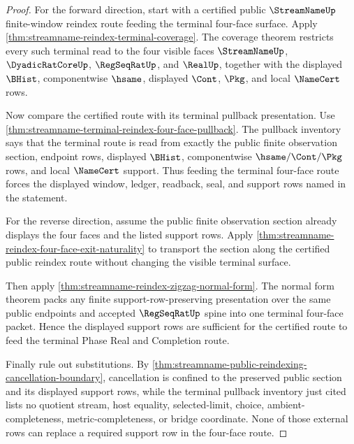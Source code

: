 \begin{proof}
For the forward direction, start with a certified public $\StreamNameUp$
finite-window reindex route feeding the terminal four-face surface. Apply
\autoref{thm:streamname-reindex-terminal-coverage}. The coverage theorem
restricts every such terminal read to the four visible faces
$\StreamNameUp$, $\DyadicRatCoreUp$, $\RegSeqRatUp$, and $\RealUp$, together
with the displayed $\BHist$, componentwise $\hsame$, displayed $\Cont$,
$\Pkg$, and local $\NameCert$ rows.

Now compare the certified route with its terminal pullback presentation. Use
\autoref{thm:streamname-terminal-reindex-four-face-pullback}. The pullback
inventory says that the terminal route is read from exactly the public finite
observation section, endpoint rows, displayed $\BHist$, componentwise
$\hsame/\Cont/\Pkg$ rows, and local $\NameCert$ support. Thus feeding the
terminal four-face route forces the displayed window, ledger, readback, seal,
and support rows named in the statement.

For the reverse direction, assume the public finite observation section
already displays the four faces and the listed support rows. Apply
\autoref{thm:streamname-reindex-four-face-exit-naturality} to transport the
section along the certified public reindex route without changing the visible
terminal surface.

Then apply
\autoref{thm:streamname-reindex-zigzag-normal-form}. The normal form theorem
packs any finite support-row-preserving presentation over the same public
endpoints and accepted $\RegSeqRatUp$ spine into one terminal four-face
packet. Hence the displayed support rows are sufficient for the certified
route to feed the terminal Phase Real and Completion route.

Finally rule out substitutions. By
\autoref{thm:streamname-public-reindexing-cancellation-boundary}, cancellation
is confined to the preserved public section and its displayed support rows,
while the terminal pullback inventory just cited lists no quotient stream,
host equality, selected-limit, choice, ambient-completeness,
metric-completeness, or bridge coordinate. None of those external rows can
replace a required support row in the four-face route.
\end{proof}

